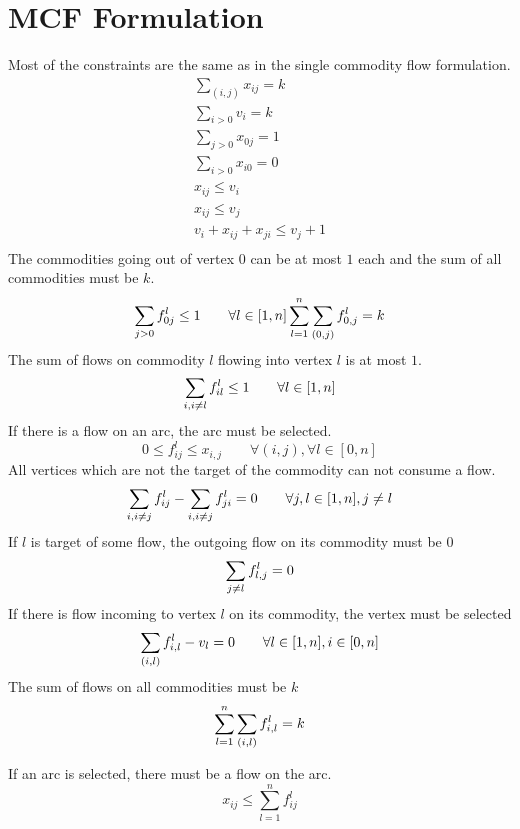 \documentclass[a4paper]{article}
\numberwithin{equation}{section}
\begin{document}
\section{MCF Formulation}
Most of the constraints are the same as in the single commodity flow formulation.
\begin{align}
	\sum_{(i,j)} x_{ij} = k\\
	\sum_{i>0}v_i =k \\
	\sum_{j>0} x_{0j}=1\\
	\sum_{i>0} x_{i0}=0\\
	x_{ij} \leq v_i\\
	x_{ij} \leq v_j\\
	v_i + x_{ij} + x_{ji} \leq v_j + 1\\
\end{align}
The commodities going out of vertex $0$ can be at most $1$ each and the sum of all commodities must be $k$.
\begin{equation}
	\sum_{j>0} f_{0j}^l \leq 1 \qquad \forall l\in [1,n]\\
	\sum_{l=1}^n \sum_{(0,j)} f_{0,j}^l = k\\
\end{equation}
The sum of flows on commodity $l$ flowing into vertex $l$ is at most $1$.
\begin{equation}
\sum_{i,i\not =l} f_{il}^l \leq 1 \qquad \forall l\in [1,n]\\
\end{equation}
If there is a flow on an arc, the arc must be selected.
\begin{equation}
0\leq f_{ij}^l \leq x_{i,j} \qquad \forall (i,j), \forall l \in [0,n]
\end{equation}
All vertices which are not the target of the commodity can not consume a flow.
\begin{equation}
\sum_{i,i\not = j}f_{ij}^l - \sum_{i,i\not = j} f_{ji}^l =0 \qquad \forall j, l\in [1,n], j\not =l \\
\end{equation}
If $l$ is target of some flow, the outgoing flow on its commodity must be $0$
\begin{equation}
\sum_{j\not=l} f_{l,j}^l =0\\
\end{equation}
If there is flow incoming to vertex $l$ on its commodity, the vertex must be selected
\begin{equation}
\sum_{(i,l)} f_{i,l}^l - v_l=0 \qquad \forall l\in [1,n], i\in[0,n]\\
\end{equation}
The sum of flows on all commodities must be $k$
\begin{equation}
	\sum_{l=1}^n \sum_{(i,l)} f_{i,l}^l = k\\
\end{equation}

If an arc is selected, there must be a flow on the arc.
\begin{equation}
x_{ij} \leq \sum_{l=1}^n f_{ij}^l
\end{equation}
\end{document}
